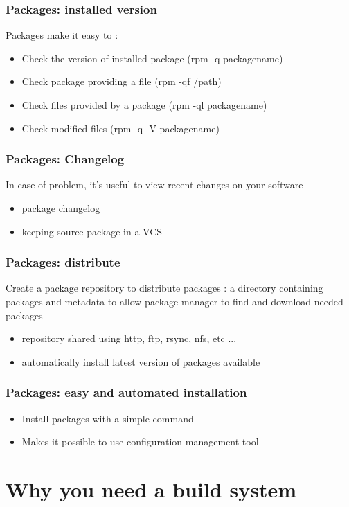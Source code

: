 \documentclass{beamer}
\begin{document}
\begin{frame}
  \frametitle{Packages: installed version}
  Packages make it easy to :
  \begin{itemize}
    \item Check the version of installed package (rpm -q packagename)
    \item Check package providing a file (rpm -qf /path)
    \item Check files provided by a package (rpm -ql packagename)
    \item Check modified files (rpm -q -V packagename)
  \end{itemize}
\end{frame}

\begin{frame}
  \frametitle{Packages: Changelog}
  In case of problem, it's useful to view recent changes on your software
  \begin{itemize}
    \item package changelog
    \item keeping source package in a VCS
  \end{itemize}
\end{frame}

\begin{frame}
  \frametitle{Packages: distribute}

  Create a package repository to distribute packages : a directory
  containing packages and metadata to allow package manager to find and
  download needed packages

  \begin{itemize}
    \item repository shared using http, ftp, rsync, nfs, etc ...
    \item automatically install latest version of packages available
  \end{itemize}
\end{frame}

\begin{frame}
  \frametitle{Packages: easy and automated installation}
  
  \begin{itemize}
    \item Install packages with a simple command
    \item Makes it possible to use configuration management tool
  \end{itemize}
\end{frame}

\section{Why you need a build system}
\end{document}
